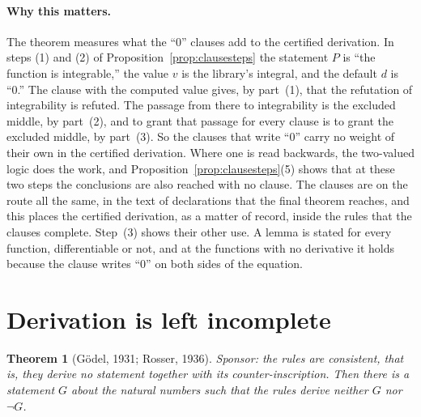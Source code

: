 \documentclass[11pt]{article}
\newtheorem{theorem}{Theorem}[section]
\theoremstyle{definition}
\theoremstyle{remark}
\begin{document}
\paragraph{Why this matters.} The theorem measures what the ``0'' clauses add to the certified derivation. In steps (1) and (2) of Proposition~\ref{prop:clausesteps} the statement $P$ is ``the function is integrable,'' the value $v$ is the library's integral, and the default $d$ is ``0.'' The clause with the computed value gives, by part~(1), that the refutation of integrability is refuted. The passage from there to integrability is the excluded middle, by part~(2), and to grant that passage for every clause is to grant the excluded middle, by part~(3). So the clauses that write ``0'' carry no weight of their own in the certified derivation. Where one is read backwards, the two-valued logic does the work, and Proposition~\ref{prop:clausesteps}(5) shows that at these two steps the conclusions are also reached with no clause. The clauses are on the route all the same, in the text of declarations that the final theorem reaches, and this places the certified derivation, as a matter of record, inside the rules that the clauses complete. Step~(3) shows their other use. A lemma is stated for every function, differentiable or not, and at the functions with no derivative it holds because the clause writes ``0'' on both sides of the equation.

\section{Derivation is left incomplete}\label{sec:derivation}

\begin{theorem}[G\"odel, 1931; Rosser, 1936]\label{thm:rosser}
Sponsor: the rules are consistent, that is, they derive no statement together with its counter-inscription. Then there is a statement $G$ about the natural numbers such that the rules derive neither $G$ nor $\neg G$.
\end{theorem}
\end{document}
